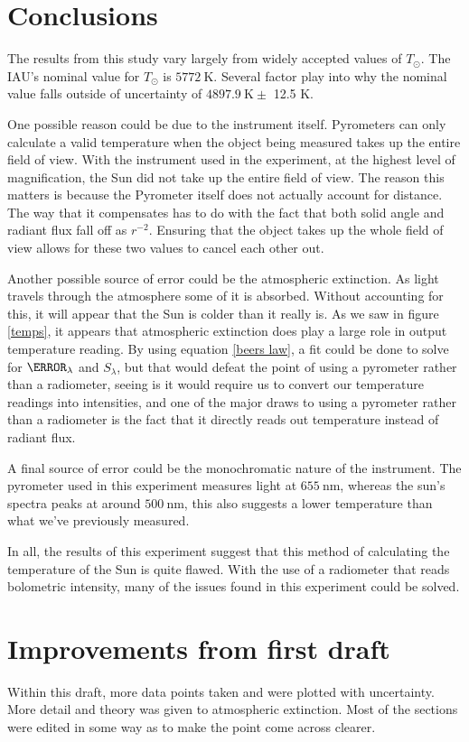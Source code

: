\documentclass[%
 reprint,
 amsmath,amssymb,
 aps,
 10pt
]{revtex4-2}
\begin{document}
\section{Conclusions}
The results from this study vary largely from widely accepted values of $T_\odot$. The IAU's nominal value for $T_\odot$ is $\SI{5772}{\kelvin}$. Several factor play into why the nominal value falls outside of uncertainty of $\SI{4897.9}{\kelvin} \pm$ 12.5 K.
\par
One possible reason could be due to the instrument itself. Pyrometers can only calculate a valid temperature when the object being measured takes up the entire field of view. With the instrument used in the experiment, at the highest level of magnification, the Sun did not take up the entire field of view. The reason this matters is because the Pyrometer itself does not actually account for distance. The way that it compensates has to do with the fact that both solid angle and radiant flux fall off as $r^{-2}$. Ensuring that the object takes up the whole field of view allows for these two values to cancel each other out. 
\par
Another possible source of error could be the atmospheric extinction. As light travels through the atmosphere some of it is absorbed. Without accounting for this, it will appear that the Sun is colder than it really is. As we saw in figure \ref{temps}, it appears that atmospheric extinction does play a large role in output temperature reading. By using equation \ref{beers law}, a fit could be done to solve for $\T_\lambda$ and $S_\lambda$, but that would defeat the point of using a pyrometer rather than a radiometer, seeing is it would require us to convert our temperature readings into intensities, and one of the major draws to using a pyrometer rather than a radiometer is the fact that it directly reads out temperature instead of radiant flux.
\par
A final source of error could be the monochromatic nature of the instrument. The pyrometer used in this experiment measures light at $\SI{655}{\nano\meter}$, whereas the sun's spectra peaks at around $\SI{500}{\nano\meter}$, this also suggests a lower temperature than what we've previously measured. 
\par
In all, the results of this experiment suggest that this method of calculating the temperature of the Sun is quite flawed. With the use of a radiometer that reads bolometric intensity, many of the issues found in this experiment could be solved.
\section{Improvements from first draft}
Within this draft, more data points taken and were plotted with uncertainty. More detail and theory was given to atmospheric extinction. Most of the sections were edited in some way as to make the point come across clearer.


\end{document}
